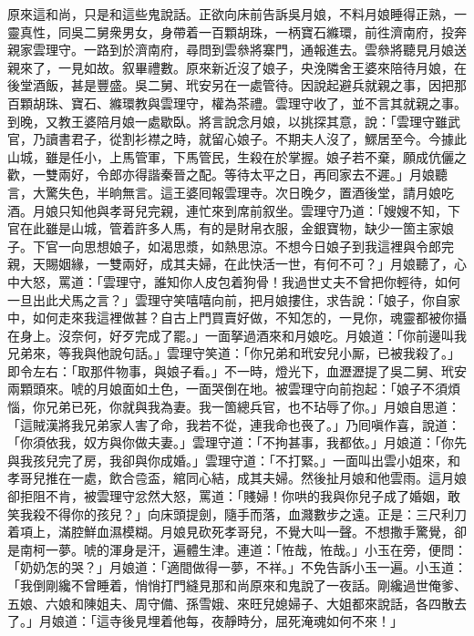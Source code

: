原來這和尚，只是和這些鬼說話。正欲向床前告訴吳月娘，不料月娘睡得正熟，一靈真性，同吳二舅衆男女，身帶着一百顆胡珠，一柄寶石縧環，前徃濟南府，投奔親家雲理守。一路到於濟南府，尋問到雲叅將寨門，通報進去。雲叅將聽見月娘送親來了，一見如故。叙畢禮數。原來新近沒了娘子，央浼隣舍王婆來陪待月娘，在後堂酒飯，甚是豐盛。吳二舅、玳安另在一處管待。因說起避兵就親之事，因把那百顆胡珠、寶石、縧環教與雲理守，權為茶禮。雲理守收了，並不言其就親之事。到晚，又教王婆陪月娘一處歇臥。將言說念月娘，以挑探其意，說：「雲理守雖武官，乃讀書君子，從割衫襟之時，就留心娘子。{}不期夫人沒了，鰥居至今。今據此山城，雖是任小，上馬管軍，下馬管民，生殺在於掌握。娘子若不棄，願成伉儷之歡，一雙兩好，令郎亦得諧秦晉之配。等待太平之日，再囘家去不遲。」月娘聽言，大驚失色，半晌無言。這王婆囘報雲理寺。次日晚夕，置酒後堂，請月娘吃酒。月娘只知他與孝哥兒完親，連忙來到席前叙坐。雲理守乃道：「嫂嫂不知，下官在此雖是山城，管着許多人馬，有的是財帛衣服，金銀寶物，缺少一箇主家娘子。下官一向思想娘子，如渴思漿，如熱思涼。不想今日娘子到我這裡與令郎完親，天賜姻緣，一雙兩好，成其夫婦，在此快活一世，有何不可？」月娘聽了，心中大怒，罵道：「雲理守，誰知你人皮包着狗骨！我過世丈夫不曾把你輕待，{}如何一旦出此犬馬之言？」雲理守笑嘻嘻向前，把月娘摟住，求告說：「娘子，你自家中，如何走來我這裡做甚？自古上門買賣好做，不知怎的，一見你，魂靈都被你攝在身上。沒奈何，好歹完成了罷。」一面拏過酒來和月娘吃。月娘道：「你前邊叫我兄弟來，等我與他說句話。」雲理守笑道：「你兄弟和玳安兒小厮，已被我殺了。」即令左右：「取那件物事，與娘子看。」不一時，燈光下，血瀝瀝提了吳二舅、玳安兩顆頭來。唬的月娘面如土色，一面哭倒在地。被雲理守向前抱起：「娘子不須煩惱，你兄弟已死，你就與我為妻。我一箇總兵官，也不玷辱了你。」月娘自思道：「這賊漢將我兄弟家人害了命，我若不從，連我命也䘮了。」乃囘嗔作喜，說道：「你須依我，奴方與你做夫妻。」雲理守道：「不拘甚事，我都依。」月娘道：「你先與我孩兒完了房，我卻與你成婚。」雲理守道：「不打緊。」一面叫出雲小姐來，和孝哥兒推在一處，飲合卺盃，綰同心結，成其夫婦。然後扯月娘和他雲雨。這月娘卻拒阻不肯，被雲理守忿然大怒，罵道：「賤婦！你哄的我與你兒子成了婚姻，敢笑我殺不得你的孩兒？」向床頭提劍，隨手而落，血濺數步之遠。正是：三尺利刀着項上，滿腔鮮血濕模糊。月娘見砍死孝哥兒，不覺大叫一聲。不想撒手驚覺，卻是南柯一夢。唬的渾身是汗，遍體生津。連道：「恠哉，恠哉。」小玉在旁，便問：「奶奶怎的哭？」月娘道：「適間做得一夢，不祥。」不免告訴小玉一遍。小玉道：「我倒剛纔不曾睡着，悄悄打門縫見那和尚原來和鬼說了一夜話。剛纔過世俺爹、五娘、六娘和陳姐夫、周守備、孫雪娥、來旺兒媳婦子、大姐都來說話，各四散去了。」月娘道：「這寺後見埋着他每，夜靜時分，屈死淹魂如何不來！」

